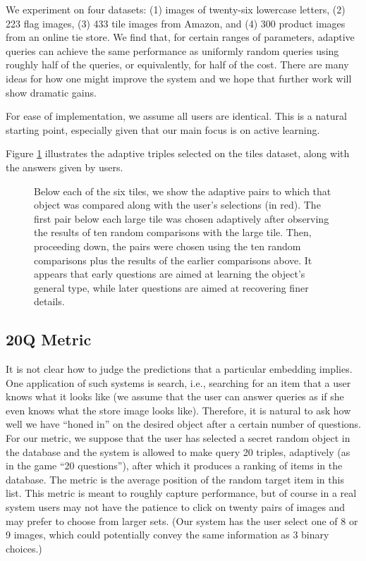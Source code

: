 \documentclass{article}
\begin{document}
We experiment on four datasets: (1) images of twenty-six lowercase letters, (2) 223 flag images, (3) 433 tile images from Amazon, and (4) 300 product images from an online tie store.  We find that, for certain ranges of parameters, adaptive queries can achieve the same performance as uniformly random queries using roughly half of the queries, or equivalently, for half of the cost.  There are many ideas for how one might improve the system and we hope that further work will show dramatic gains.

For ease of implementation, we assume all users are identical.  This is a natural starting point, especially given that our main focus is on active learning.

Figure \ref{fig:adaptive-trips} illustrates the adaptive triples selected on the tiles dataset, along with the answers given by users.
\begin{figure}
 \caption{\label{fig:adaptive-trips} Below each of the six tiles, we show the adaptive pairs to which that object was compared along with the user's selections (in red).  The first pair below each large tile was chosen adaptively after observing the results of ten random comparisons with the large tile.  Then, proceeding down, the pairs were chosen using the ten random comparisons plus the results of the earlier comparisons above.  It appears that early questions are aimed at learning the object's general type, while later questions are aimed at recovering finer details.}
\end{figure}


\subsection{20Q Metric}
It is not clear how to judge the predictions that a particular embedding implies.  One application of such systems is search, i.e., searching for an item that a user knows what it looks like (we assume that the user can answer queries as if she even knows what the store image looks like).  Therefore, it is natural to ask how well we have ``honed in'' on the desired object after a certain number of questions.  For our metric, we suppose that the user has selected a secret random object in the database and the system is allowed to make query 20 triples, adaptively (as in the game ``20 questions''), after which it produces a ranking of items in the database.  The metric is the average position of the random target item in this list.  This metric is meant to roughly capture performance, but of course in a real system users may not have the patience to click on twenty pairs of images and may prefer to choose from larger sets. (Our system has the user select one of 8 or 9 images, which could potentially convey the same information as 3 binary choices.)
\end{document}
